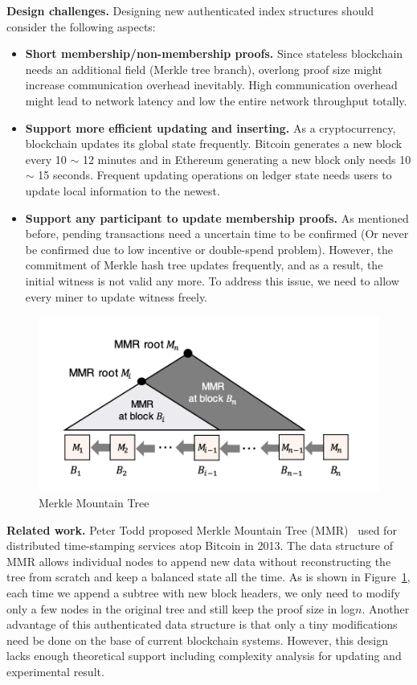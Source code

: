 \documentclass[conference]{IEEEtran}
\begin{document}
\textbf{Design challenges.} 
Designing new authenticated index structures should consider the following aspects:

\begin{itemize}
  \item \textbf{Short membership/non-membership proofs.} 
  Since stateless blockchain needs an additional field (Merkle tree branch), overlong proof size might increase communication overhead inevitably.
  High communication overhead might lead to network latency and low the entire network throughput totally.
  \item \textbf{Support more efficient updating and inserting.}
  As a cryptocurrency, blockchain updates its global state frequently. Bitcoin generates a new block every 10 $\sim$ 12 minutes and in Ethereum generating a new block only needs 10 $\sim$ 15 seconds.
  Frequent updating operations on ledger state needs users to update local information to the newest.
  \item \textbf{Support any participant to update membership proofs.}
  As mentioned before, pending transactions need a uncertain time to be confirmed (Or never be confirmed due to low incentive or double-spend problem).
  However, the commitment of Merkle hash tree updates frequently, and as a result, the initial witness is not valid any more.
  To address this issue, we need to allow every miner to update witness freely.
\end{itemize}

\begin{figure}[!ht]
  \centering
  \includegraphics[width=\linewidth]{figs/MMR.png}
  \caption{Merkle Mountain Tree}
  \label{e-trie}
\end{figure}

\textbf{Related work.}
Peter Todd proposed Merkle Mountain Tree (MMR)~\cite{Tod} used for distributed time-stamping services atop Bitcoin in 2013. 
%
The data structure of MMR allows individual nodes to append new data without reconstructing the tree from scratch and keep a balanced state all the time.
%
As is shown in Figure~\ref{e-trie}, each time we append a subtree with new block headers, we only need to modify only a few nodes in the original tree and still keep the proof size in log\(n\).
%
Another advantage of this authenticated data structure is that only a tiny modifications need be done on the base of current blockchain systems.
%
However, this design lacks enough theoretical support including complexity analysis for updating and experimental result.
\end{document}
